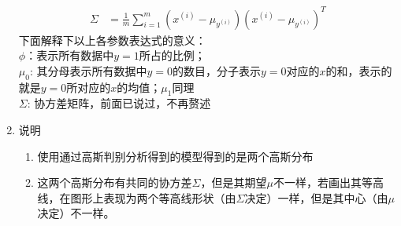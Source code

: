 \begin{enumerate}
\begin{align}
		\Sigma &= \frac{1}{m}\sum_{i=1}^{m}\left(x^{(i)}-\mu_{y^{(i)}}\right)\left(x^{(i)}-\mu_{y^{(i)}}\right)^T
	\end{align}
	下面解释下以上各参数表达式的意义： \\
	$\phi$：表示所有数据中$y=1$所占的比例； \\
	$\mu_0$: 其分母表示所有数据中$y=0$的数目，分子表示$y=0$对应的$x$的和，表示的就是$y=0$所对应的$x$的均值；$\mu_1$同理 \\
	$\Sigma$: 协方差矩阵，前面已说过，不再赘述
	\item 说明
	\begin{enumerate}
		\item 使用通过高斯判别分析得到的模型得到的是两个高斯分布
		\item 这两个高斯分布有共同的协方差$\Sigma$，但是其期望$\mu$不一样，若画出其等高线，在图形上表现为两个等高线形状（由$\Sigma$决定）一样，但是其中心（由$\mu$决定）不一样。
	\end{enumerate}
\end{enumerate}


